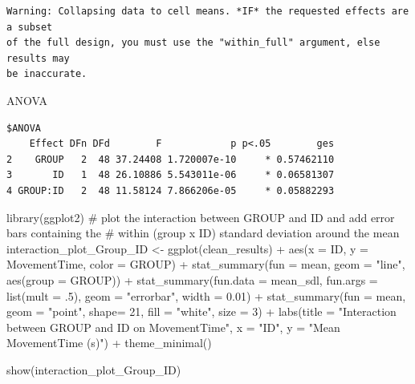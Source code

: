 \documentclass[
  letterpaper,
  DIV=11,
  numbers=noendperiod]{scrartcl}
\newenvironment{Shaded}{\begin{snugshade}}{\end{snugshade}}
\newcommand{\AttributeTok}[1]{\textcolor[rgb]{0.40,0.45,0.13}{#1}}
\newcommand{\CommentTok}[1]{\textcolor[rgb]{0.37,0.37,0.37}{#1}}
\newcommand{\DecValTok}[1]{\textcolor[rgb]{0.68,0.00,0.00}{#1}}
\newcommand{\FloatTok}[1]{\textcolor[rgb]{0.68,0.00,0.00}{#1}}
\newcommand{\FunctionTok}[1]{\textcolor[rgb]{0.28,0.35,0.67}{#1}}
\newcommand{\NormalTok}[1]{\textcolor[rgb]{0.00,0.23,0.31}{#1}}
\newcommand{\OtherTok}[1]{\textcolor[rgb]{0.00,0.23,0.31}{#1}}
\newcommand{\SpecialCharTok}[1]{\textcolor[rgb]{0.37,0.37,0.37}{#1}}
\newcommand{\StringTok}[1]{\textcolor[rgb]{0.13,0.47,0.30}{#1}}
\begin{document}
\begin{verbatim}
Warning: Collapsing data to cell means. *IF* the requested effects are a subset
of the full design, you must use the "within_full" argument, else results may
be inaccurate.
\end{verbatim}

\begin{Shaded}
\begin{Highlighting}[]
\NormalTok{ANOVA}
\end{Highlighting}
\end{Shaded}

\begin{verbatim}
$ANOVA
    Effect DFn DFd        F            p p<.05        ges
2    GROUP   2  48 37.24408 1.720007e-10     * 0.57462110
3       ID   1  48 26.10886 5.543011e-06     * 0.06581307
4 GROUP:ID   2  48 11.58124 7.866206e-05     * 0.05882293
\end{verbatim}

\begin{Shaded}
\begin{Highlighting}[]
\FunctionTok{library}\NormalTok{(ggplot2)}
\CommentTok{\# plot the interaction between GROUP and ID and add error bars containing the }
\CommentTok{\# within (group x ID) standard deviation around the mean}
\NormalTok{interaction\_plot\_Group\_ID }\OtherTok{\textless{}{-}} \FunctionTok{ggplot}\NormalTok{(clean\_results) }\SpecialCharTok{+}
  \FunctionTok{aes}\NormalTok{(}\AttributeTok{x =}\NormalTok{ ID, }\AttributeTok{y =}\NormalTok{ MovementTime, }\AttributeTok{color =}\NormalTok{ GROUP) }\SpecialCharTok{+}
  \FunctionTok{stat\_summary}\NormalTok{(}\AttributeTok{fun =}\NormalTok{ mean, }\AttributeTok{geom =} \StringTok{"line"}\NormalTok{, }\FunctionTok{aes}\NormalTok{(}\AttributeTok{group =}\NormalTok{ GROUP)) }\SpecialCharTok{+}
  \FunctionTok{stat\_summary}\NormalTok{(}\AttributeTok{fun.data =}\NormalTok{ mean\_sdl, }\AttributeTok{fun.args =} \FunctionTok{list}\NormalTok{(}\AttributeTok{mult =}\NormalTok{ .}\DecValTok{5}\NormalTok{), }\AttributeTok{geom =} \StringTok{"errorbar"}\NormalTok{, }\AttributeTok{width =} \FloatTok{0.01}\NormalTok{) }\SpecialCharTok{+}
  \FunctionTok{stat\_summary}\NormalTok{(}\AttributeTok{fun =}\NormalTok{ mean, }\AttributeTok{geom =} \StringTok{"point"}\NormalTok{, }\AttributeTok{shape=} \DecValTok{21}\NormalTok{, }\AttributeTok{fill =} \StringTok{"white"}\NormalTok{, }\AttributeTok{size =} \DecValTok{3}\NormalTok{) }\SpecialCharTok{+}
  \FunctionTok{labs}\NormalTok{(}\AttributeTok{title =} \StringTok{"Interaction between GROUP and ID on MovementTime"}\NormalTok{,}
       \AttributeTok{x =} \StringTok{"ID"}\NormalTok{,}
       \AttributeTok{y =} \StringTok{"Mean MovementTime (s)"}\NormalTok{) }\SpecialCharTok{+}
  \FunctionTok{theme\_minimal}\NormalTok{()}

\FunctionTok{show}\NormalTok{(interaction\_plot\_Group\_ID)}
\end{Highlighting}
\end{Shaded}
\end{document}
